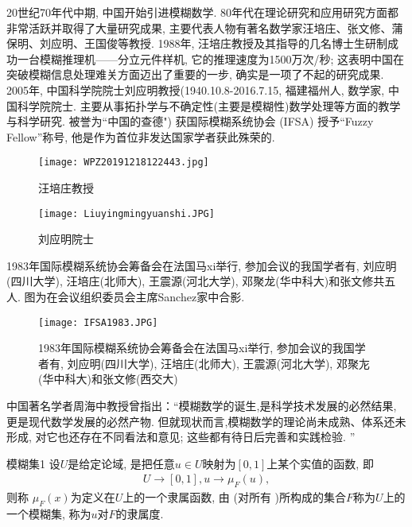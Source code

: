 20世纪70年代中期, 中国开始引进模糊数学.
80年代在理论研究和应用研究方面都非常活跃并取得了大量研究成果, 主要代表人物有著名数学家汪培庄、张文修、蒲保明、刘应明、王国俊等教授.
1988年, 汪培庄教授及其指导的几名博士生研制成功一台模糊推理机——分立元件样机, 它的推理速度为1500万次/秒; 这表明中国在突破模糊信息处理难关方面迈出了重要的一步, 确实是一项了不起的研究成果.
2005年, 中国科学院院士刘应明教授(1940.10.8-2016.7.15, 福建福州人, 数学家, 中国科学院院士.
主要从事拓扑学与不确定性(主要是模糊性)数学处理等方面的教学与科学研究. 被誉为“中国的查德") 获国际模糊系统协会 (IFSA) 授予“Fuzzy Fellow”称号, 他是作为首位非发达国家学者获此殊荣的.
\begin{figure}[H]
    \centering
    \texttt{[image: WPZ20191218122443.jpg]}
    \caption{汪培庄教授}
    \label{WPZ20191218122443}
\end{figure}
\begin{figure}[H]
    \centering
    \texttt{[image: Liuyingmingyuanshi.JPG]}
    \caption{刘应明院士}
    \label{WPZ20191218122443}
\end{figure}
1983年国际模糊系统协会筹备会在法国马xi举行, 参加会议的我国学者有, 刘应明(四川大学), 汪培庄(北师大), 王震源(河北大学), 邓聚龙(华中科大)和张文修共五人. 图为在会议组织委员会主席Sanchez家中合影.
\begin{figure}[H]
    \centering
    \texttt{[image: IFSA1983.JPG]}
    \caption{1983年国际模糊系统协会筹备会在法国马xi举行, 参加会议的我国学者有, 刘应明(四川大学), 汪培庄(北师大), 王震源(河北大学), 邓聚㔫(华中科大)和张文修(西交大)}
    \label{WPZ20191218122443}
\end{figure}
中国著名学者周海中教授曾指出：“模糊数学的诞生,是科学技术发展的必然结果, 更是现代数学发展的必然产物. 但就现状而言,模糊数学的理论尚未成熟、体系还未形成, 对它也还存在不同看法和意见; 这些都有待日后完善和实践检验. ”
\begin{mydef}{模糊集}{1}
设$U$是给定论域,   是把任意$u\in U$映射为$[0, 1]$上某个实值的函数, 即
\begin{align}
    U\rightarrow [0, 1], u\rightarrow \mu_F(u),
\end{align}
则称 $ \mu_F(x)$为定义在$U$上的一个隶属函数, 由   (对所有    )所构成的集合$F$称为$U$上的一个模糊集, 称为$u$对$F$的隶属度.
\end{mydef}

